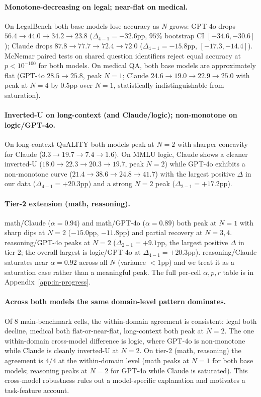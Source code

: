 \documentclass{article}
\begin{document}
\paragraph{Monotone-decreasing on legal; near-flat on medical.} On LegalBench both base models lose accuracy as $N$ grows: GPT-4o drops $56.4 \to 44.0 \to 34.2 \to 23.8$ ($\Delta_{4-1}{=}{-}32.6$pp, $95\%$ bootstrap CI $[-34.6,-30.6]$); Claude drops $87.8 \to 77.7 \to 72.4 \to 72.0$ ($\Delta_{4-1}{=}{-}15.8$pp, $[-17.3,-14.4]$). McNemar paired tests on shared question identifiers reject equal accuracy at $p < 10^{-100}$ for both models. On medical QA, both base models are approximately flat (GPT-4o $28.5 \to 25.8$, peak $N{=}1$; Claude $24.6 \to 19.0 \to 22.9 \to 25.0$ with peak at $N{=}4$ by $0.5$pp over $N{=}1$, statistically indistinguishable from saturation).

\paragraph{Inverted-U on long-context (and Claude/logic); non-monotone on logic/GPT-4o.} On long-context QuALITY both models peak at $N{=}2$ with sharper concavity for Claude ($3.3 \to 19.7 \to 7.4 \to 1.6$). On MMLU logic, Claude shows a cleaner inverted-U ($18.0 \to 22.3 \to 20.3 \to 19.7$, peak $N{=}2$) while GPT-4o exhibits a non-monotone curve ($21.4 \to 38.6 \to 24.8 \to 41.7$) with the largest positive $\Delta$ in our data ($\Delta_{4-1}{=}{+}20.3$pp) and a strong $N{=}2$ peak ($\Delta_{2-1}{=}{+}17.2$pp).

\paragraph{Tier-2 extension (math, reasoning).} math/Claude ($\alpha{=}0.94$) and math/GPT-4o ($\alpha{=}0.89$) both peak at $N{=}1$ with sharp dips at $N{=}2$ ($-15.0$pp, $-11.8$pp) and partial recovery at $N{=}3,4$. reasoning/GPT-4o peaks at $N{=}2$ ($\Delta_{2-1}{=}{+}9.1$pp, the largest positive $\Delta$ in tier-2; the overall largest is logic/GPT-4o at $\Delta_{4-1}{=}{+}20.3$pp). reasoning/Claude saturates near $\alpha{=}0.92$ across all $N$ (variance $<\!1$pp) and we treat it as a saturation case rather than a meaningful peak. The full per-cell $\alpha, p, r$ table is in Appendix~\ref{app:in-progress}.

\paragraph{Across both models the same domain-level pattern dominates.} Of $8$ main-benchmark cells, the within-domain agreement is consistent: legal both decline, medical both flat-or-near-flat, long-context both peak at $N{=}2$. The one within-domain cross-model difference is logic, where GPT-4o is non-monotone while Claude is cleanly inverted-U at $N{=}2$. On tier-2 (math, reasoning) the agreement is $4/4$ at the within-domain level (math peaks at $N{=}1$ for both base models; reasoning peaks at $N{=}2$ for GPT-4o while Claude is saturated). This cross-model robustness rules out a model-specific explanation and motivates a task-feature account.
\end{document}
